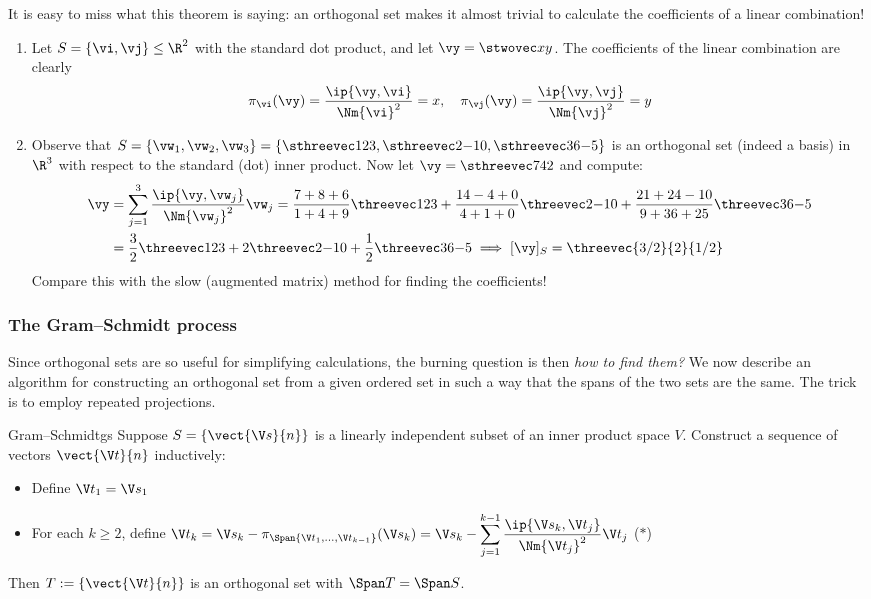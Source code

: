 It is easy to miss what this theorem is saying: an orthogonal set makes it almost trivial to calculate the coefficients of a linear combination!



\begin{examples}{}{}
\begin{enumerate}
  \item Let $S=\{\vi,\vj\}\le\R^2$ with the standard dot product, and let $\vy=\stwovec xy$. The coefficients of the linear combination are clearly\vspace{-3pt}
  \[\pi_{\vi}(\vy)=\frac{\ip{\vy,\vi}}{\Nm{\vi}^2}=x,\quad \pi_{\vj}(\vy)=\frac{\ip{\vy,\vj}}{\Nm{\vj}^2}=y\]
  \item Observe that $S=\{\vw_1,\vw_2,\vw_3\}=\left\{\sthreevec 123,\sthreevec 2{-1}0,\sthreevec 36{-5}\right\}$ is an orthogonal set (indeed a basis) in $\R^3$ with respect to the standard (dot) inner product. Now let $\vy=\sthreevec 742$ and compute:\vspace{-5pt}
	\begin{align*}
	\vy&=\sum_{j=1}^3\frac{\ip{\vy,\vw_j}}{\Nm{\vw_j}^2}\vw_j = \frac{7+8+6}{1+4+9}\threevec 123 + \frac{14-4+0}{4+1+0}\threevec 2{-1}0 + \frac{21+24-10}{9+36+25}\threevec 36{-5}\\
	&= \frac 32\threevec 123 + 2\threevec 2{-1}0 + \frac 12\threevec 36{-5} \implies [\vy]_S=\threevec{3/2}{2}{1/2}
	\end{align*}
	Compare this with the slow (augmented matrix) method for finding the coefficients!
\end{enumerate}

\end{examples}


\subsubsection*{The Gram--Schmidt process}

Since orthogonal sets are so useful for simplifying calculations, the burning question is then \emph{how to find them?} We now describe an algorithm for constructing an orthogonal set from a given ordered set in such a way that the spans of the two sets are the same. The trick is to employ repeated projections.

\def\vs{{\V s}}
\def\vt{{\V t}}

\begin{thm}{Gram--Schmidt}{gs}
Suppose $S=\{\vect{\vs}{n}\}$ is a linearly independent subset of an inner product space $V$. Construct a sequence of vectors $\vect{\vt}{n}$ inductively:\vspace{-2pt}
\begin{itemize}\itemsep0pt
  \item Define $\vt_1=\vs_1$\vspace{-5pt}
  \item For each $k\ge 2$, define $\displaystyle\vt_k=\vs_k-\pi_{\Span\{\vt_1,\ldots,\vt_{k-1}\}}(\vs_k) =\vs_k-\sum_{j=1}^{k-1}\frac{\ip{\vs_k,\vt_j}}{\Nm{\vt_j}^2}\vt_j$ \hfill($\ast$)
\end{itemize}
Then $T:=\{\vect{\vt}{n}\}$ is an orthogonal set with $\Span T=\Span S$.
\end{thm}

